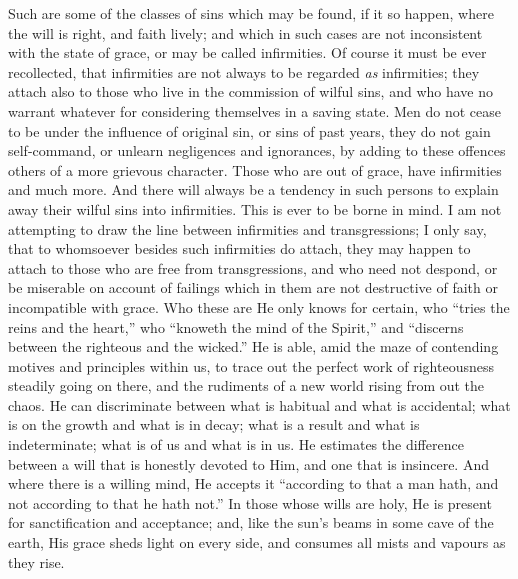 Such are some of the classes of sins which may be found, if it so
happen, where the will is right, and faith lively; and which in such
cases are not inconsistent with the state of grace, or may be called
infirmities. Of course it must be ever recollected, that infirmities
are not always to be regarded \emph{as} infirmities; they attach also
to those who live in the commission of wilful sins, and who have no
warrant whatever for considering themselves in a saving state. Men do
not cease to be under the influence of original sin, or sins of past
years, they do not gain self-command, or unlearn negligences and
ignorances, by adding to these offences others of a more grievous
character. Those who are out of grace, have infirmities and much more.
And there will always be a tendency in such persons to explain away
their wilful sins into infirmities. This is ever to be borne in mind.
I am not attempting to draw the line between infirmities and
transgressions; I only say, that to whomsoever besides such
infirmities do attach, they may happen to attach to those who are free
from transgressions, and who need not despond, or be miserable on
account of failings which in them are not destructive of faith or
incompatible with grace. Who these are He only knows for certain, who
``tries the reins and the heart,'' who ``knoweth the mind
of the Spirit,'' and ``discerns between the righteous and the
wicked.'' He is able, amid the maze of contending motives and
principles within us, to trace out the perfect work of righteousness
steadily going on there, and the rudiments of a new world rising from
out the chaos. He can discriminate between what is habitual and what
is accidental; what is on the growth and what is in decay; what is a
result and what is indeterminate; what is of us and what is in us. He
estimates the difference between a will that is honestly devoted to
Him, and one that is insincere. And where there is a willing mind, He
accepts it ``according to that a man hath, and not according to
that he hath not.'' In those whose wills are holy, He is present
for sanctification and acceptance; and, like the sun's beams in some
cave of the earth, His grace sheds light on every side, and consumes
all mists and vapours as they rise.

